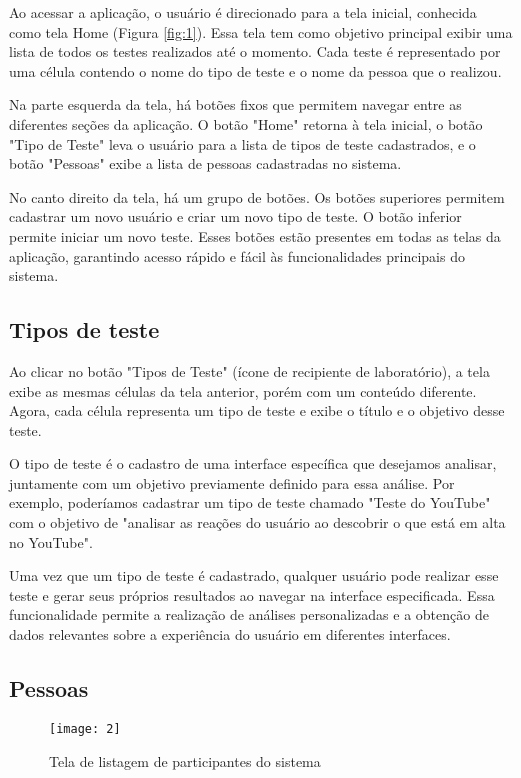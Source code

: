 Ao acessar a aplicação, o usuário é direcionado para a tela inicial, conhecida como tela Home (Figura \ref{fig:1}). Essa tela tem como objetivo principal exibir uma lista de todos os testes realizados até o momento. Cada teste é representado por uma célula contendo o nome do tipo de teste e o nome da pessoa que o realizou.

Na parte esquerda da tela, há botões fixos que permitem navegar entre as diferentes seções da aplicação. O botão "Home" retorna à tela inicial, o botão "Tipo de Teste" leva o usuário para a lista de tipos de teste cadastrados, e o botão "Pessoas" exibe a lista de pessoas cadastradas no sistema.

No canto direito da tela, há um grupo de botões. Os botões superiores permitem cadastrar um novo usuário e criar um novo tipo de teste. O botão inferior permite iniciar um novo teste. Esses botões estão presentes em todas as telas da aplicação, garantindo acesso rápido e fácil às funcionalidades principais do sistema.

\subsection{Tipos de teste}

Ao clicar no botão "Tipos de Teste" (ícone de recipiente de laboratório), a tela exibe as mesmas células da tela anterior, porém com um conteúdo diferente. Agora, cada célula representa um tipo de teste e exibe o título e o objetivo desse teste.

O tipo de teste é o cadastro de uma interface específica que desejamos analisar, juntamente com um objetivo previamente definido para essa análise. Por exemplo, poderíamos cadastrar um tipo de teste chamado "Teste do YouTube" com o objetivo de "analisar as reações do usuário ao descobrir o que está em alta no YouTube".

Uma vez que um tipo de teste é cadastrado, qualquer usuário pode realizar esse teste e gerar seus próprios resultados ao navegar na interface especificada. Essa funcionalidade permite a realização de análises personalizadas e a obtenção de dados relevantes sobre a experiência do usuário em diferentes interfaces.

\subsection{Pessoas}

\begin{figure}[h]
  \caption{Tela de listagem de participantes do sistema}
  \centering
  \texttt{[image: 2]}
  \label{fig:2}
\end{figure}
\FloatBarrier

